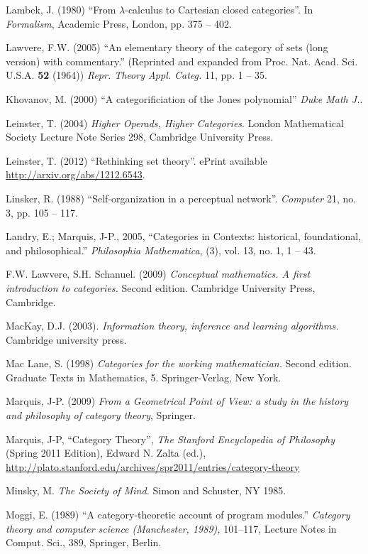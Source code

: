 \documentclass[a4paper]{book}
\theoremstyle{myth}
\begin{document}
\begin{russian}
\begin{thebibliography}{SGWB}
 Lambek, J. (1980) “From $\lambda$-calculus to Cartesian closed categories”. In {\em Formalism}, Academic Press, London, pp. 375 -- 402.

 Lawvere, F.W. (2005) “An elementary theory of the category of sets (long version) with
   commentary.” (Reprinted and expanded from Proc. Nat. Acad. Sci. U.S.A. {\bf 52}
   (1964)) {\em Repr. Theory Appl. Categ.} 11, pp. 1 -- 35.
   
 Khovanov, M. (2000) “A categorificiation of the Jones polynomial” {\em Duke Math J.}.

 Leinster, T. (2004) {\em Higher Operads, Higher Categories}. London Mathematical Society Lecture Note Series 298, Cambridge University Press.

 Leinster, T. (2012) “Rethinking set theory”. ePrint available \url{http://arxiv.org/abs/1212.6543}.

 Linsker, R. (1988) “Self-organization in a perceptual network”. {\em Computer} 21, no. 3, pp. 105 -- 117.

 Landry, E.; Marquis, J-P., 2005, “Categories in Contexts: historical, foundational, and philosophical.” {\em Philosophia Mathematica}, (3), vol. 13, no. 1, 1 -- 43.

 F.W. Lawvere, S.H. Schanuel. (2009) {\em Conceptual mathematics. 
A first introduction to categories.} Second edition. Cambridge University Press, Cambridge.

 MacKay, D.J. (2003). {\em Information theory, inference and learning algorithms.} Cambridge university press.

 Mac Lane, S. (1998) {\em Categories for the working mathematician.} Second edition. Graduate Texts in Mathematics, 5. Springer-Verlag, New York.

 Marquis, J-P. (2009) {\em From a Geometrical Point of View: a study in the history and philosophy of category theory}, Springer.

 Marquis, J-P, “Category Theory”, {\em The Stanford Encyclopedia of Philosophy} (Spring 2011 Edition), Edward N. Zalta (ed.), \url{http://plato.stanford.edu/archives/spr2011/entries/category-theory}

 Minsky, M. {\em The Society of Mind.}  Simon and Schuster, NY 1985.

 Moggi, E. (1989) “A category-theoretic account of program modules.” {\em Category theory and computer science (Manchester, 1989),} 101–117, Lecture Notes in Comput. Sci., 389, Springer, Berlin. 


\end{thebibliography}
\end{russian}
\end{document}
